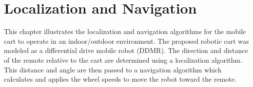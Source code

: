 \chapter{Localization and Navigation}
\label{ch: Chapter4}

This chapter illustrates the localization and navigation algorithms for the mobile cart to operate in an indoor/outdoor environment. The proposed robotic cart was modeled as a differential drive mobile robot (DDMR). The direction and distance of the remote relative to the cart are determined using a localization algorithm. This distance and angle are then passed to a navigation algorithm which calculates and applies the wheel speeds to move the robot toward the remote.

